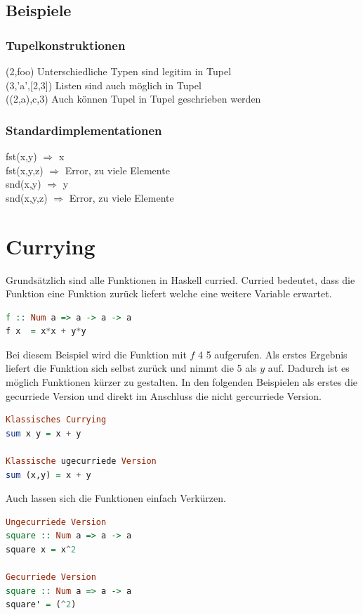 \subsection{Beispiele}
\subsubsection{Tupelkonstruktionen}
(2,\grqq foo\grqq  ) Unterschiedliche Typen sind legitim in Tupel\\
(3,'a',[2,3]) Listen sind auch möglich in Tupel\\
((2,\grqq a\grqq),\grqq c\grqq ,3) Auch können Tupel in Tupel geschrieben werden\\
\subsubsection{Standardimplementationen}
fst(x,y) $\Rightarrow$ x \\
fst(x,y,z) $\Rightarrow$ Error, zu viele Elemente \\
snd(x,y) $\Rightarrow$ y\\
snd(x,y,z) $\Rightarrow$ Error, zu viele Elemente

\section{Currying}
Grundsätzlich sind alle Funktionen in Haskell curried. Curried bedeutet, dass die Funktion eine Funktion zurück liefert welche eine weitere Variable erwartet. 
\newline
\begin{lstlisting}[language=Haskell]  
f :: Num a => a -> a -> a 
f x  = x*x + y*y
\end{lstlisting}
\qquad\newline
Bei diesem Beispiel wird die Funktion mit $f$ 4 5 aufgerufen. Als erstes Ergebnis liefert die Funktion sich selbst zurück und nimmt die 5 als $y$ auf. Dadurch ist es möglich Funktionen kürzer zu gestalten. In den folgenden Beispielen als erstes die gecurriede Version und direkt im Anschluss die nicht gercurriede Version. 
\newline
\begin{lstlisting}[language=Haskell]  
Klassisches Currying
sum x y = x + y

Klassische ugecurriede Version
sum (x,y) = x + y
\end{lstlisting}
\qquad\newline
Auch lassen sich die Funktionen einfach Verkürzen. 
\begin{lstlisting}[language=Haskell]  
Ungecurriede Version
square :: Num a => a -> a
square x = x^2

Gecurriede Version
square :: Num a => a -> a
square' = (^2)
\end{lstlisting}
